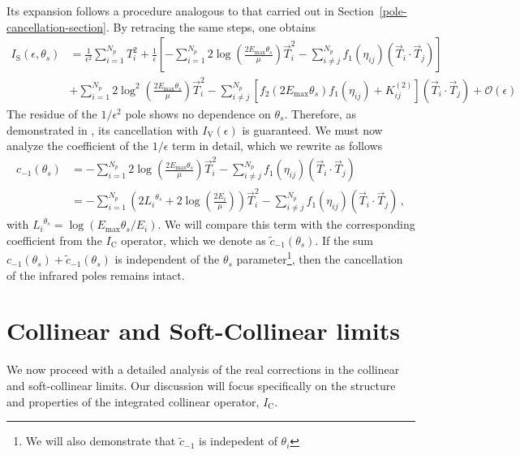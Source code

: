 \documentclass[a4paper, 12pt]{book}
\begin{document}
Its expansion follows a procedure analogous to that carried out in Section~\ref{pole-cancellation-section}. By retracing the same steps, one obtains
\begin{equation}
  \begin{aligned}
  I_{\mathrm{S}} (\epsilon, \theta_s) &= \frac{1}{\epsilon^2} \sum_{i=1}^{N_p} T_i^2 + \frac{1}{\epsilon}\left[-\sum_{i=1}^{N_p} 2 \log{\left(\frac{2 E_{\mathrm{max}}\theta_s}{\mu} \right)} \vec{T}_i^2 - \sum_{i\neq j}^{N_p} f_1(\eta_{ij}) (\vec{T}_i \cdot \vec{T}_j) \right]  \\
  &  + \sum_{i=1}^{N_p} 2 \log^2{\left(\frac{2 E_{\mathrm{max}}\theta_s}{\mu} \right)}\vec{T}_i^2 - \sum_{i\neq j}^{N_p} \left[ f_2 \left(2 E_{\mathrm{max}}\theta_s\right) f_1(\eta_{ij}) + K_{ij}^{(2)}\right] (\vec{T}_i \cdot \vec{T}_j) + \mathcal{O}(\epsilon)
  \end{aligned}
\end{equation}
The residue of the $1/\epsilon^2$ pole shows no dependence on $\theta_s$. Therefore, as demonstrated in \cite{Devoto:2023rpv}, its cancellation with $I_{\mathrm{V}}(\epsilon)$ is guaranteed. We must now analyze the coefficient of the $1/\epsilon$ term in detail, which we rewrite as follows
\begin{equation}
  \begin{aligned}
  c_{-1}(\theta_s) & = -\sum_{i=1}^{N_p} 2 \log{\left(\frac{2 E_{\mathrm{max}}\theta_s}{\mu} \right)} \vec{T}_i^2 - \sum_{i\neq j}^{N_p} f_1(\eta_{ij}) (\vec{T}_i \cdot \vec{T}_j)  \\
  & = -\sum_{i=1}^{N_p} \left( 2{L_i}^{\theta_s} + 2 \log{\left(\frac{2 E_i}{\mu} \right) } \right) \vec{T}_i^2 - \sum_{i\neq j}^{N_p} f_1(\eta_{ij}) (\vec{T}_i \cdot \vec{T}_j) \, ,
  \label{coefficient-soft}
  \end{aligned}
\end{equation}
with ${L_i}^{\theta_s}=\log{\left(E_{\mathrm{max}}\theta_s/E_i\right)}$. We will compare this term with the corresponding coefficient from the $I_{\mathrm{C}}$ operator, which we denote as $\tilde{c}_{-1}(\theta_s)$. If the sum $c_{-1}(\theta_s) + \tilde{c}_{-1}(\theta_s)$ is independent of the $\theta_s$ parameter\footnote{We will also demonstrate that $\tilde{c}_{-1}$ is indepedent of $\theta_i$}, then the cancellation of the infrared poles remains intact.

\section{Collinear and Soft-Collinear limits}
We now proceed with a detailed analysis of the real corrections in the collinear and soft-collinear limits. Our discussion will focus specifically on the structure and properties of the integrated collinear operator, $I_{\mathrm{C}}$.
\end{document}
